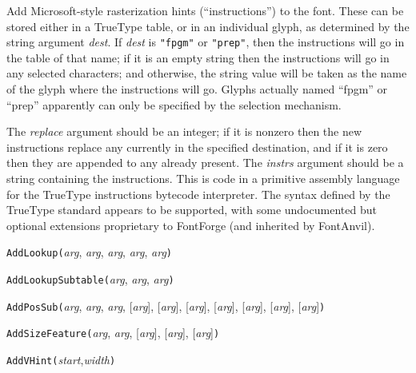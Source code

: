 Add Microsoft-style rasterization hints (``instructions'') to the font. 
These can be stored either in a TrueType table, or in an individual glyph,
as determined by the string argument \textit{dest}.  If \textit{dest} is
\texttt{"fpgm"} or \texttt{"prep"}, then the instructions will go in the
table of that name; if it is an empty string then the instructions will go
in any selected characters; and otherwise, the string value will be taken as
the name of the glyph where the instructions will go.  Glyphs actually named
``fpgm'' or ``prep'' apparently can only be specified by the selection
mechanism.

The \textit{replace} argument should be an integer; if it is nonzero then
the new instructions replace any currently in the specified destination, and
if it is zero then they are appended to any already present.  The
\textit{instrs} argument should be a string containing the instructions. 
This is code in a primitive assembly language for the TrueType instructions
bytecode interpreter.  The syntax defined by the TrueType standard appears
to be supported, with some undocumented but optional extensions proprietary
to FontForge (and inherited by FontAnvil).



\texttt{AddLookup(}\textit{arg}, \textit{arg}, \textit{arg}, \textit{arg}, \textit{arg}\texttt{)}



\texttt{AddLookupSubtable(}\textit{arg}, \textit{arg}, \textit{arg}\texttt{)}



\texttt{AddPosSub(}\textit{arg}, \textit{arg}, \textit{arg}, [\textit{arg}], [\textit{arg}], [\textit{arg}], [\textit{arg}], [\textit{arg}], [\textit{arg}], [\textit{arg}]\texttt{)}



\texttt{AddSizeFeature(}\textit{arg}, \textit{arg}, [\textit{arg}], [\textit{arg}], [\textit{arg}]\texttt{)}



\texttt{AddVHint(}\textit{start},\textit{width}\texttt{)}

